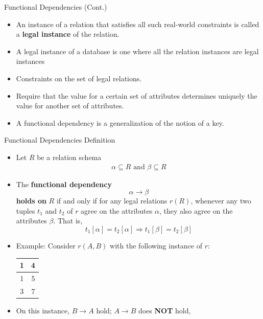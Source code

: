 \documentclass{beamer}
\begin{document}
\begin{frame}{Functional Dependencies (Cont.)}
    \begin{itemize}
        \item An instance of a relation that satisfies all such real-world constraints is called a \textbf{legal instance} of the relation.
        \item A legal instance of a database is one where all the relation instances are legal instances
        \item Constraints on the set of legal relations.
        \item Require that the value for a certain set of attributes determines uniquely the value for another set of attributes.
        \item A functional dependency is a generalization of the notion of a key.
    \end{itemize}
\end{frame}

\begin{frame}{Functional Dependencies Definition}
    \begin{itemize}
        \item Let $R$ be a relation schema
            \begin{equation*}
                \begin{align*}
                    \alpha \subseteq R \text{ and } \beta \subseteq R
                \end{align*}
            \end{equation*}
        \item The \textbf{functional dependency}
            $$
                \alpha \rightarrow \beta
            $$
            \textbf{holds on} $R$ if and only if for any legal relations $r(R)$, whenever any two tuples $t_1$ and $t_2$ of $r$ agree on the attributes $\alpha$, they also agree on the attributes $\beta$. That is,
            $$
                t_1[\alpha] = t_2[\alpha] \Rightarrow t_1[\beta] = t_2 [\beta]
            $$
        \item Example: Consider $r(A,B)$ with the following instance of $r$: \\
            \centering
            \begin{tabular}{|c|c|}
                \hline
                1 & 4 \\ \hline
                1 & 5 \\ \hline
                3 & 7 \\ \hline
            \end{tabular}
        \item On this instance, $B \rightarrow A$ hold; $A \rightarrow B$ does \textbf{NOT} hold,
    \end{itemize}
\end{frame}
\end{document}
